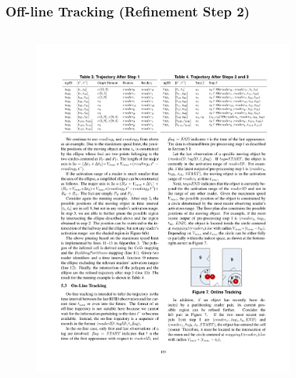 
\begin{frame}
\frametitle{Off-line Tracking (Refinement Step 2)}

\begin{columns}[c]

  \vspace{-15pt}
  \begin{figure}[tb]
    \includegraphics[width=\columnwidth]{figures/2-1/2-1-10.pdf}
  \end{figure}
  \vspace{-20pt}
  \begin{figure}[tb]

\end{figure}
\end{columns}
\end{frame}
